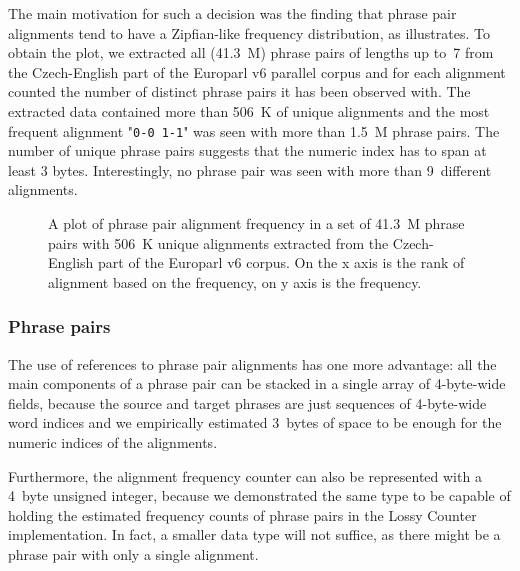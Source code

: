 The main motivation for such a decision was the finding that phrase pair alignments tend to
have a Zipfian-like frequency distribution, as  illustrates.
To obtain the plot, we extracted all (41.3~M) phrase pairs of lengths up to~7 from
the Czech-English part of the Europarl v6 parallel corpus and for each alignment counted
the number of distinct phrase pairs it has been observed with.
The extracted data contained more than 506~K of unique alignments and the most frequent
alignment "\texttt{0-0 1-1}" was seen with more than 1.5~M phrase pairs.
The number of unique phrase pairs suggests that the numeric index has to span at least
3 bytes.
Interestingly, no phrase pair was seen with more than 9~different alignments.

\begin{figure}[ht]
  
  \caption{
    A plot of phrase pair alignment frequency in a set of 41.3~M phrase pairs with
    506~K unique alignments extracted from the Czech-English part of the Europarl v6 corpus.
    On the x axis is the rank of alignment based on the frequency, on y axis is the frequency.
  }
  \label{fig:alignment-dist}
\end{figure}

\subsubsection*{Phrase pairs}

The use of references to phrase pair alignments has one more advantage: all the main
components of a phrase pair can be stacked in a single array of 4-byte-wide fields,
because the source and target phrases are just sequences of 4-byte-wide word indices
and we empirically estimated 3~bytes of space to be enough for the numeric indices
of the alignments.

Furthermore, the alignment frequency counter can also be represented with a 4~byte
unsigned integer, because we demonstrated the same type to be capable of holding
the estimated frequency counts of phrase pairs in the Lossy Counter implementation.
In fact, a smaller data type will not suffice, as there might be a phrase pair with
only a single alignment.

